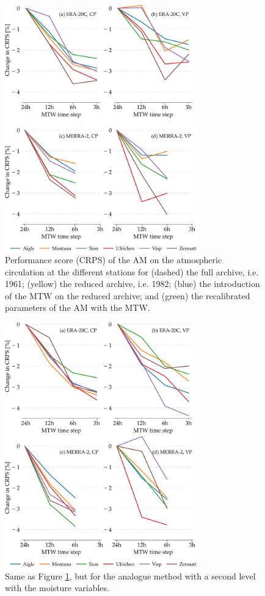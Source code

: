 \documentclass[hess, manuscript]{copernicus}
\begin{document}
	\begin{figure}[htb]
		\includegraphics[width=8.3cm]{fig03.pdf}
		\caption{Performance score (CRPS) of the AM on the atmospheric circulation at the different stations for (dashed) the full archive, i.e. 1961; (yellow) the reduced archive, i.e. 1982; (blue) the introduction of the MTW on the reduced archive; and (green) the recalibrated parameters of the AM with the MTW.}
		\label{fig:plots_CRPS_2Z}
	\end{figure}
	
	\begin{figure}[htb]
		\includegraphics[width=8.3cm]{fig04.pdf}
		\caption{Same as Figure \ref{fig:plots_CRPS_2Z}, but for the analogue method with a second level with the moisture variables.}
		\label{fig:plots_CRPS_2Z-2MI}
	\end{figure}
	
\end{document}
